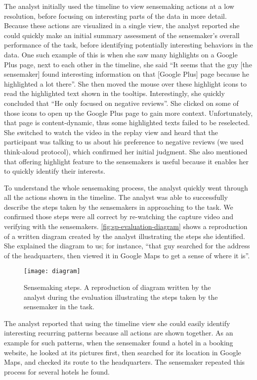 The analyst initially used the timeline to view sensemaking actions at a low resolution, before focusing on interesting parts of the data in more detail. Because these actions are visualized in a single view, the analyst reported she could quickly make an initial summary assessment of the sensemaker's overall performance of the task, before identifying potentially interesting behaviors in the data. One such example of this is when she saw many highlights on a Google Plus page, next to each other in the timeline, she said ``It seems that the guy [the sensemaker] found interesting information on that [Google Plus] page because he highlighted a lot there''. She then moved the mouse over these highlight icons to read the highlighted text shown in the tooltips. Interestingly, she quickly concluded that ``He only focused on negative reviews''. She clicked on some of those icons to open up the Google Plus page to gain more context. Unfortunately, that page is content-dynamic, thus some highlighted texts failed to be reselected. She switched to watch the video in the replay view and heard that the participant was talking to us about his preference to negative reviews (we used think-aloud protocol), which confirmed her initial judgment. She also mentioned that offering highlight feature to the sensemakers is useful because it enables her to quickly identify their interests.

To understand the whole sensemaking process, the analyst quickly went through all the actions shown in the timeline. The analyst was able to successfully describe the steps taken by the sensemakers in approaching to the task. We confirmed those steps were all correct by re-watching the capture video and verifying with the sensemakers. \autoref{fig:sp-evaluation-diagram} shows a reproduction of a written diagram created by the analyst illustrating the steps she identified. She explained the diagram to us; for instance, ``that guy searched for the address of the headquarters, then viewed it in Google Maps to get a sense of where it is''.

\begin{figure}[ht]
\centering
\texttt{[image: diagram]}
\caption{Sensemaking steps. A reproduction of diagram written by the analyst during the evaluation illustrating the steps taken by the sensemaker in the task.}
\label{fig:sp-evaluation-diagram}
\end{figure}

The analyst reported that using the timeline view she could easily identify interesting recurring patterns because all actions are shown together. As an example for such patterns, when the sensemaker found a hotel in a booking website, he looked at its pictures first, then searched for its location in Google Maps, and checked its route to the headquarters. The sensemaker repeated this process for several hotels he found.

